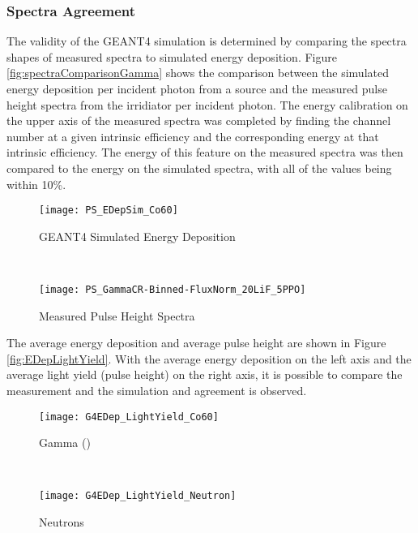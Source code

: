 \subsubsection{Spectra Agreement}
The validity of the GEANT4 simulation is determined by comparing the spectra shapes of measured spectra to simulated energy deposition.
Figure \ref{fig:spectraComparisonGamma} shows the comparison between the simulated energy deposition per incident photon from a  source and the measured pulse height spectra from the  irridiator per incident photon.
The energy calibration on the upper axis of the measured spectra was completed by finding the channel number at a given intrinsic efficiency and the corresponding energy at that intrinsic efficiency.
The energy of this feature on the measured spectra was then compared to the energy on the simulated spectra, with all of the values being within 10\%.
\begin{figure*}[ht]
	\centering
	\begin{subfigure}[b]{0.45\textwidth}
    		\texttt{[image: PS\_EDepSim\_Co60]}
		\caption{GEANT4 Simulated Energy Deposition}
	\end{subfigure}%
	~
	\begin{subfigure}[b]{0.45\textwidth}
    \texttt{[image: PS\_GammaCR-Binned-FluxNorm\_20LiF\_5PPO]}
		\caption{Measured Pulse Height Spectra}
	\end{subfigure}%
	\caption{Comparison of the energy deposition and binned pulse height spectra for validation. The spectra have the same shape, indicating agreement. The fabricated films greater than \SI{600}{\um} were of poor optical quality and therefore their results are not shown.}
	\label{fig:spectraComparisonGamma}
\end{figure*}
The average energy deposition and average pulse height are shown in Figure \ref{fig:EDepLightYield}. 
With the average energy deposition on the left axis and the average light yield (pulse height) on the right axis, it is possible to compare the measurement and the simulation and agreement is observed.
\begin{figure*}[ht]
	\centering
	\begin{subfigure}[b]{0.45\textwidth}
    		\texttt{[image: G4EDep\_LightYield\_Co60]}
		\caption{Gamma ()}
	\end{subfigure}%
	~
	\begin{subfigure}[b]{0.45\textwidth}
    		\texttt{[image: G4EDep\_LightYield\_Neutron]}
		\caption{Neutrons}
	\end{subfigure}%
	\caption{Average Energy Deposition and Measured Light Yield. The solid lines are calculated values and the red dots are measurements.}
	\label{fig:EDepLightYield}
\end{figure*}


